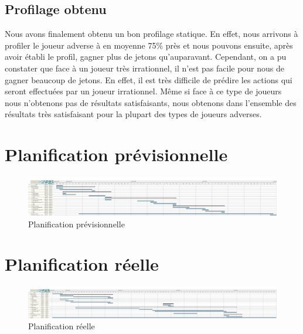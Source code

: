 \documentclass{report}
\begin{document}
\section{Profilage obtenu}
\hspace{0.5cm}Nous avons finalement obtenu un bon profilage statique. En effet, nous arrivons à profiler le joueur adverse à en moyenne 75\% près et nous pouvons ensuite, après avoir établi le profil, gagner plus de jetons qu’auparavant. Cependant, on a pu constater que face à un joueur très irrationnel, il n'est pas facile pour nous de gagner beaucoup de jetons. En effet, il est très difficile de prédire les actions qui seront effectuées par un joueur irrationnel. Même si face à ce type de joueurs nous n'obtenons pas de résultats satisfaisants, nous obtenons dans l'ensemble des résultats très satisfaisant pour la plupart des types de joueurs adverses.\par







\nocite{*}


\appendix
\chapter{Planification prévisionnelle}
	\begin{figure}
		 \hspace{-4cm} 
			\includegraphics[scale=0.4]{../DiagrammePrevisionnel.png}
			\caption[Planification prévisionnelle]{Planification prévisionnelle}
	\end{figure}
	\medskip
		
\chapter{Planification réelle}
	\begin{figure}
		 \hspace{-4cm} 
			\includegraphics[scale=0.4]{../DiagrammeReel.png}
			\caption[Planification réelle]{Planification réelle}
	\end{figure}
	\medskip
		
		
		
\end{document}
